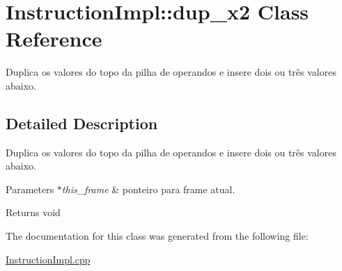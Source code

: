 \hypertarget{class_instruction_impl_1_1dup__x2}{}\section{Instruction\+Impl\+:\+:dup\+\_\+x2 Class Reference}
\label{class_instruction_impl_1_1dup__x2}


Duplica os valores do topo da pilha de operandos e insere dois ou três valores abaixo.  




\subsection{Detailed Description}
Duplica os valores do topo da pilha de operandos e insere dois ou três valores abaixo. 


\begin{DoxyParams}{Parameters}
{\em $\ast$this\+\_\+frame} & ponteiro para frame atual. \\
\hline
\end{DoxyParams}
\begin{DoxyReturn}{Returns}
void 
\end{DoxyReturn}


The documentation for this class was generated from the following file\+:\begin{DoxyCompactItemize}
\item 
\hyperlink{_instruction_impl_8cpp}{Instruction\+Impl.\+cpp}\end{DoxyCompactItemize}
